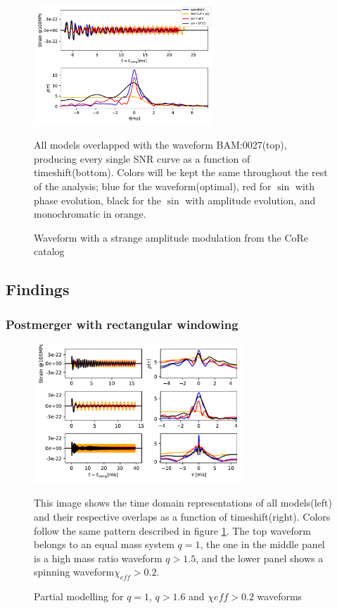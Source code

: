 \begin{figure}[hbt!]
\begin{center}
\includegraphics[width=0.6\textwidth, angle=0]{images/Data_analysis/results/phi-A0.pdf}
\caption{Waveform with a strange amplitude modulation from the CoRe catalog}
\label{analysis}
\end{center}
All models overlapped with the waveform BAM:0027(top), producing every single SNR curve as a function of timeshift(bottom). Colors will be kept the same throughout the rest of the analysis; blue for the waveform(optimal), red for $\sin$ with phase evolution, black for the $\sin$ with amplitude evolution, and monochromatic in orange.
\end{figure}
\FloatBarrier

\subsection*{Findings}

\subsubsection*{Postmerger with rectangular windowing}

\begin{figure}[hbt!]
\begin{center}
\includegraphics[width=0.7\textwidth, angle=0]{images/Data_analysis/results/phi-A1.pdf}
\caption{Partial modelling for $q=1$, $q>1.6$ and $\chi{eff}>0.2$ waveforms}
\end{center}
This image shows the time domain representations of all models(left) and their respective overlaps as a function of timeshift(right). Colors follow the same pattern described in figure \ref{analysis}. The top waveform belongs to an equal mass system $q=1$, the one in the middle panel is a high mass ratio waveform $q>1.5$, and the lower panel shows a spinning waveform$\chi_{eff}>0.2$.
\end{figure}

